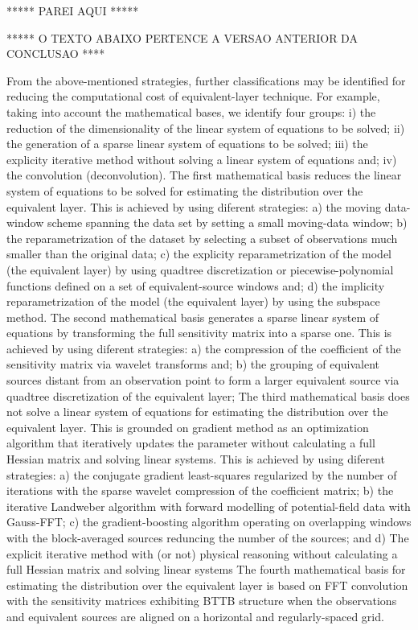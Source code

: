 ***** PAREI AQUI *****

***** O TEXTO ABAIXO PERTENCE A VERSAO ANTERIOR DA CONCLUSAO ****

From the above-mentioned strategies, further classifications may be identified for reducing the computational cost of equivalent-layer technique. 
For example, taking into account the mathematical bases, we identify four groups:
i) the reduction of the dimensionality of the linear system of equations to be solved;  
ii) the  generation of a sparse linear system of  equations to be solved; 
iii) the explicity iterative method  without solving a linear system of equations and;
iv) the convolution (deconvolution).
The first mathematical basis reduces the linear system of equations to be solved for estimating the distribution over the equivalent layer.
This is achieved by using diferent strategies: 
a) the moving data-window scheme spanning the data set by setting a small moving-data window;   
b) the reparametrization of the dataset by selecting a subset of observations much smaller than the original data;
c) the explicity reparametrization of the model (the equivalent layer) by using quadtree discretization or piecewise-polynomial functions defined on a set of equivalent-source windows and; 
d) the implicity reparametrization of the model (the equivalent layer) by using the subspace method. 
The second mathematical basis generates a sparse linear system of equations 
by transforming the full sensitivity matrix into a sparse one.
This is achieved by using diferent strategies: 
a) the compression of the coefficient of the sensitivity matrix via wavelet transforms and;
b) the grouping of equivalent sources distant from an observation point to form a larger equivalent source via quadtree discretization of the equivalent layer;
The third mathematical basis does not solve a linear system of equations
for estimating the distribution over the equivalent layer.
This is grounded on  gradient method as an optimization algorithm 
that iteratively updates the parameter without calculating a full Hessian matrix and solving linear systems.
This is achieved by using diferent strategies: 
a) the conjugate gradient least-squares regularized by the number of iterations  with the sparse wavelet compression of the coefficient matrix;
b) the iterative Landweber algorithm with forward modelling of potential-field data with Gauss-FFT;
c) the gradient-boosting algorithm operating on overlapping windows with the block-averaged sources
reduncing the number of the sources; and
d) The explicit iterative method with (or not) physical reasoning without calculating a full Hessian matrix and solving linear systems
The fourth mathematical basis for estimating the distribution over the equivalent layer is based on FFT convolution with the sensitivity matrices exhibiting BTTB structure when the observations and equivalent sources are aligned on a horizontal and regularly-spaced grid. 

